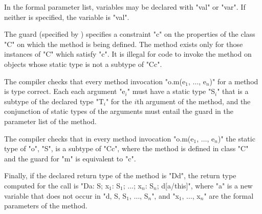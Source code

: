 In the formal parameter list, variables may be declared with
\xcd"val" or \xcd"var".  If neither is specified, the variable
is \xcd"val".

\label{MethodWhereClause}

The guard (specified by )
specifies a constraint \xcd"c" on the
properties of the class \xcd"C" on which the method is being defined. The
method exists only for those instances of \xcd"C" which satisfy \xcd"c".  It is
illegal for code to invoke the method on objects whose static type is
not a subtype of \xcd"C{c}".

\begin{staticrule*}
    The compiler checks that every method invocation
    \xcdmath"o.m(e$_1$, $\dots$, e$_n$)"
    for a method is type correct. Each each argument
    \xcdmath"e$_i$" must have a
    static type \xcdmath"S$_i$" that is a subtype of the declared type
    \xcdmath"T$_i$" for the $i$th
    argument of the method, and the conjunction of static types
    of the arguments must entail the guard in the parameter list
    of the method.

    The compiler checks that in every method invocation
    \xcdmath"o.m(e$_1$, $\dots$, e$_n$)"
    the static type of \xcd"o", \xcd"S", is a subtype of \xcd"C{c}", where the method
    is defined in class \xcd"C" and the guard for \xcd"m" is equivalent to
    \xcd"c".

    Finally, if the declared return type of the method is
    \xcd"D{d}", the
    return type computed for the call is
    \xcdmath"D{a: S; x$_1$: S$_1$; $\dots$; x$_n$: S$_n$; d[a/this]}",
    where \xcd"a" is a new
    variable that does not occur in
    \xcdmath"d, S, S$_1$, $\dots$, S$_n$", and
    \xcdmath"x$_1$, $\dots$, x$_n$" are the formal
    parameters of the method.
\end{staticrule*}

